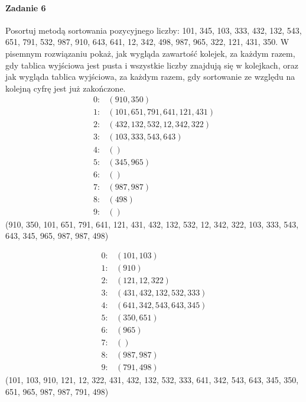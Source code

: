 \documentclass[18pt]{extarticle}
\begin{document}
\pagebreak
\paragraph{Zadanie 6} Posortuj metodą sortowania pozycyjnego liczby: 101, 345, 103, 333, 432, 132, 543, 651, 791, 532, 987, 910, 643, 641, 12, 342, 498, 987, 965, 322, 121, 431, 350. W pisemnym rozwiązaniu pokaż, jak wygląda zawartość kolejek, za każdym razem, gdy tablica wyjściowa jest pusta i wszystkie liczby znajdują się w kolejkach, oraz jak wygląda tablica wyjściowa, za każdym razem, gdy sortowanie ze względu na kolejną cyfrę jest już zakończone.
\begin{align*}
    0: & \left(910, 350\right) \\
    1: & \left(101, 651, 791, 641, 121, 431\right) \\
    2: & \left(432, 132, 532, 12, 342, 322\right) \\
    3: & \left(103, 333, 543, 643\right) \\
    4: & \left(\right) \\
    5: & \left(345, 965\right) \\
    6: & \left(\right) \\
    7: & \left(987, 987\right) \\
    8: & \left(498\right) \\
    9: & \left(\right)
\end{align*}
(910, 350, 101, 651, 791, 641, 121, 431, 432, 132, 532, 12, 342, 322, 103, 333, 543, 643, 345, 965, 987, 987, 498)

\begin{align*}
    0: & \left(101, 103\right) \\
    1: & \left(910\right) \\
    2: & \left(121, 12, 322\right) \\
    3: & \left(431, 432, 132, 532, 333\right) \\
    4: & \left(641, 342, 543, 643, 345\right) \\
    5: & \left(350, 651\right) \\
    6: & \left(965\right) \\
    7: & \left(\right) \\
    8: & \left(987, 987\right) \\
    9: & \left(791, 498\right)
\end{align*}
(101, 103, 910, 121, 12, 322, 431, 432, 132, 532, 333, 641, 342, 543, 643, 345, 350, 651, 965, 987, 987, 791, 498)
\end{document}

